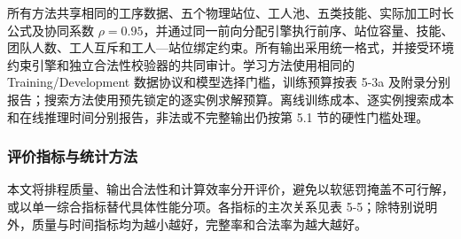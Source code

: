 \documentclass[journal,10pt]{IEEEtran}
\begin{document}
所有方法共享相同的工序数据、五个物理站位、工人池、五类技能、实际加工时长公式及协同系数 \(\rho=0.95\)，并通过同一前向分配引擎执行前序、站位容量、技能、团队人数、工人互斥和工人---站位绑定约束。所有输出采用统一格式，并接受环境约束引擎和独立合法性校验器的共同审计。学习方法使用相同的 Training/Development 数据协议和模型选择门槛，训练预算按表 5-3a 及附录分别报告；搜索方法使用预先锁定的逐实例求解预算。离线训练成本、逐实例搜索成本和在线推理时间分别报告，非法或不完整输出仍按第 5.1 节的硬性门槛处理。

\subsubsection{评价指标与统计方法}\label{ux8bc4ux4ef7ux6307ux6807ux4e0eux7edfux8ba1ux65b9ux6cd5}

本文将排程质量、输出合法性和计算效率分开评价，避免以软惩罚掩盖不可行解，或以单一综合指标替代具体性能分项。各指标的主次关系见表 5-5；除特别说明外，质量与时间指标均为越小越好，完整率和合法率为越大越好。
\end{document}
